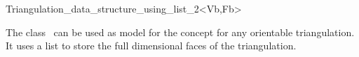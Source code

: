 

\begin{ccRefClass}{Triangulation_data_structure_using_list_2<Vb,Fb>}  %

\ccDefinition
  
The class \ccRefName\ can be used as model
for the  concept
 for any
orientable triangulation. It uses a \stl list to store the
full dimensional faces of the triangulation.



\ccIsModel




\end{ccRefClass}


